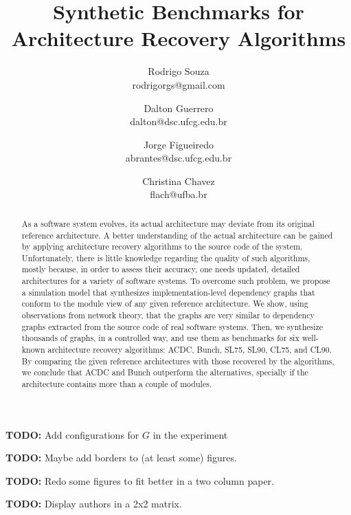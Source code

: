 \documentclass[11pt,twocolumn,a4paper,english]{article}
\title{
Synthetic Benchmarks for Architecture Recovery Algorithms}
\author{Rodrigo Souza \\ rodrigorgs@gmail.com 
\and Dalton Guerrero \\ dalton@dsc.ufcg.edu.br
\and Jorge Figueiredo \\ abrantes@dsc.ufcg.edu.br
\and Christina Chavez \\ flach@ufba.br
}
\newcommand{\TODO}{\textbf{TODO:} }
\begin{document}
\sloppy
\maketitle

\tableofcontents
\vspace{1 em}

\TODO Add configurations for $G$ in the experiment

\TODO Maybe add borders to (at least some) figures.

\TODO Redo some figures to fit better in a two column paper.

\TODO Display authors in a 2x2 matrix.



\begin{abstract}
	As a software system evolves, its actual architecture may deviate from its original reference architecture. A better understanding of the actual architecture can be gained by applying architecture recovery algorithms to the source code of the system. Unfortunately, there is little knowledge regarding the quality of such algorithms, mostly because, in order to assess their accuracy, one needs updated, detailed architectures for a variety of software systems.
	To overcome such problem, we propose a simulation model that synthesizes implementation-level dependency graphs that conform to the module view of any given reference architecture. We show, using observations from network theory, that the graphs are very similar to dependency graphs extracted from the source code of real software systems. 
	Then, we synthesize thousands of graphs, in a controlled way, and use them as benchmarks for six well-known architecture recovery algorithms: ACDC, Bunch, SL75, SL90, CL75, and CL90. By comparing the given reference architectures with those recovered by the algorithms, we conclude that ACDC and Bunch outperform the alternatives, specially if the architecture contains more than a couple of modules.\end{abstract}
\end{document}
